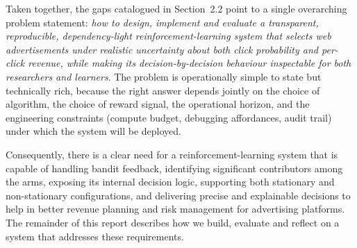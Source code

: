 Taken together, the gaps catalogued in Section~2.2 point to a single overarching problem statement: \emph{how to design, implement and evaluate a transparent, reproducible, dependency-light reinforcement-learning system that selects web advertisements under realistic uncertainty about both click probability and per-click revenue, while making its decision-by-decision behaviour inspectable for both researchers and learners}. The problem is operationally simple to state but technically rich, because the right answer depends jointly on the choice of algorithm, the choice of reward signal, the operational horizon, and the engineering constraints (compute budget, debugging affordances, audit trail) under which the system will be deployed.

Consequently, there is a clear need for a reinforcement-learning system that is capable of handling bandit feedback, identifying significant contributors among the arms, exposing its internal decision logic, supporting both stationary and non-stationary configurations, and delivering precise and explainable decisions to help in better revenue planning and risk management for advertising platforms. The remainder of this report describes how we build, evaluate and reflect on a system that addresses these requirements.
\newpage
